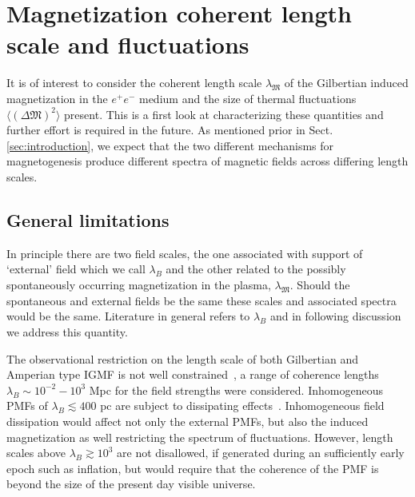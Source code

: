 \documentclass[aps,prd,floatfix,reprint]{revtex4-2}
\newcommand{\rsec}[1]{Sect.\,{\ref{#1}}}
\newcommand*{\xblue}{\color{blue}}
\begin{document}
{\xblue
\section{Magnetization coherent length scale and fluctuations}
\label{sec:lengthscale}
\noindent It is of interest to consider the coherent length scale $\lambda_\mathfrak{M}$ of the Gilbertian induced magnetization in the $e^{+}e^{-}$ medium and the size of thermal fluctuations $\langle(\Delta\mathfrak{M})^{2}\rangle$ present. This is a first look at characterizing these quantities and further effort is required in the future. As mentioned prior in \rsec{sec:introduction}, we expect that the two different mechanisms for magnetogenesis produce different spectra of magnetic fields across differing length scales. 

\subsection{General limitations}
\label{sec:limitations}
\noindent In principle there are two field scales, the one associated with support of `external' field which we call $\lambda_B$ and the other related to the possibly spontaneously occurring magnetization in the plasma, $\lambda_\mathfrak{M}$. Should the spontaneous and external fields be the same these scales and associated spectra would be the same. Literature in general refers to $\lambda_B$ and in following discussion we address this quantity.

The observational restriction on the  length scale of both Gilbertian and Amperian type IGMF is  not well constrained~\cite{Giovannini:2022rrl,Durrer:2013pga,AlvesBatista:2021sln}, a range of coherence lengths  $\lambda_{B}\sim10^{-2}-10^{3}$ Mpc for the field strengths were considered. Inhomogeneous PMFs of $\lambda_{B}\lesssim400$ pc are subject to dissipating effects~\cite{Jedamzik:1999bm}. Inhomogeneous field dissipation would affect not only the external PMFs, but also the induced magnetization as well restricting the spectrum of fluctuations. However, length scales above $\lambda_{B}\gtrsim10^{3}$ are not disallowed, if generated during an sufficiently early epoch such as inflation, but would require that the coherence of the PMF is beyond the size of the present day visible universe.

}
\end{document}
